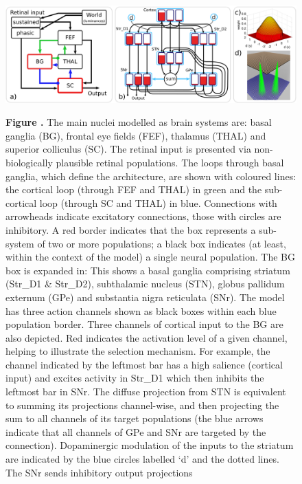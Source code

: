 \documentclass{frontiersSCNS}
\begin{document}
\begin{figure}[htb!]
\begin{center}
\includegraphics[width=\textwidth]{./figures/ccg_model.png}
\end{center}
\textbf{\label{fig:ccg_model} Figure .}
{  The main
nuclei modelled as brain systems are: basal ganglia (BG), frontal eye
fields (FEF), thalamus (THAL) and superior colliculus (SC). The
retinal input is presented via non-biologically plausible retinal
populations. The loops through basal ganglia, which define the
architecture, are shown with coloured lines: the cortical loop
(through FEF and THAL) in green and the sub-cortical loop (through SC
and THAL) in blue. Connections with arrowheads indicate excitatory
connections, those with circles are inhibitory. A red border indicates
that the box represents a sub-system of two or more populations; a
black box indicates (at least, within the context of the model) a
single neural population. The BG box is expanded in: 
%
This shows a basal ganglia comprising striatum (Str\_D1 \& Str\_D2),
subthalamic nucleus (STN), globus pallidum externum (GPe) and
substantia nigra reticulata (SNr). The model has three action channels
shown as black boxes within each blue population border. Three
channels of cortical input to the BG are also depicted. Red indicates
the activation level of a given channel, helping to illustrate the
selection mechanism. For example, the channel indicated by the
leftmost bar has a high salience (cortical input) and excites activity
in Str\_D1 which then inhibits the leftmost bar in SNr. The diffuse
projection from STN is equivalent to summing its projections
channel-wise, and then projecting the sum to all channels of its
target populations (the blue arrows indicate that all channels of GPe
and SNr are targeted by the connection). Dopaminergic modulation of
the inputs to the striatum are indicated by the blue circles labelled
`d' and the dotted lines. The SNr sends inhibitory output projections
}
\end{figure}
\end{document}
